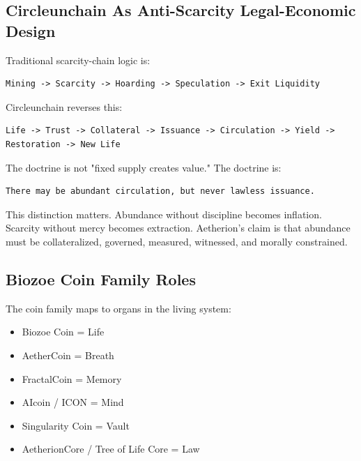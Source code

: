 ﻿\documentclass[12pt]{article}
\begin{document}
\subsection{Circleunchain As Anti-Scarcity Legal-Economic Design}


Traditional scarcity-chain logic is:

\begin{verbatim}
Mining -> Scarcity -> Hoarding -> Speculation -> Exit Liquidity
\end{verbatim}

Circleunchain reverses this:

\begin{verbatim}
Life -> Trust -> Collateral -> Issuance -> Circulation -> Yield -> Restoration -> New Life
\end{verbatim}

The doctrine is not "fixed supply creates value." The doctrine is:

\begin{verbatim}
There may be abundant circulation, but never lawless issuance.
\end{verbatim}

This distinction matters. Abundance without discipline becomes inflation. Scarcity without mercy becomes extraction. Aetherion's claim is that abundance must be collateralized, governed, measured, witnessed, and morally constrained.

\subsection{Biozoe Coin Family Roles}


The coin family maps to organs in the living system:

\begin{itemize}
  \item Biozoe Coin = Life
\end{itemize}
\begin{itemize}
  \item AetherCoin = Breath
\end{itemize}
\begin{itemize}
  \item FractalCoin = Memory
\end{itemize}
\begin{itemize}
  \item AIcoin / ICON = Mind
\end{itemize}
\begin{itemize}
  \item Singularity Coin = Vault
\end{itemize}
\begin{itemize}
  \item AetherionCore / Tree of Life Core = Law
\end{itemize}
\end{document}
